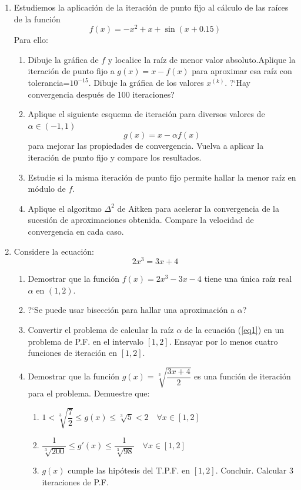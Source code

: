 \documentclass[12pt,letterpaper]{article}
\begin{document}
\begin{enumerate}
\item Estudiemos la aplicaci\'on de la iteraci\'on de punto fijo al c\'alculo de las ra\'ices de la funci\'on
$$
f(x) = -x^2 + x + \sin(x + 0.15)
$$
Para ello:
 \begin{enumerate}
  \item Dibuje la gr\'afica de $f$ y localice la ra\'iz de menor valor absoluto.Aplique la iteraci\'on de punto fijo a $g(x) = x - f(x)$ para aproximar esa ra\'iz con tolerancia=$10^{-15}$. Dibuje la
 gr\'afica de los valores $x^{(k)}$. ?`Hay convergencia despu\'es de 100 iteraciones?

 \item Aplique el siguiente esquema de iteraci\'on para diversos valores de $\alpha \in (-1,1)$ 
 $$
 g(x) = x - \alpha f(x)
 $$
 para mejorar las propiedades de convergencia. Vuelva a aplicar la iteraci\'on de punto fijo y compare los resultados.

 \item Estudie si la misma iteraci\'on de punto fijo permite hallar la menor ra\'iz en m\'odulo de $f$.

 \item Aplique el algoritmo $\Delta^2$ de Aitken para acelerar la convergencia de la sucesi\'on de aproximaciones obtenida.
Compare la velocidad de convergencia en cada caso.
 \end{enumerate}
\item Considere la ecuaci\'on:
\begin{equation}\label{eq1}
 2x^3 = 3x+4
\end{equation}

\begin{enumerate}
 \item Demostrar que la funci\'on $f(x) = 2x^3 - 3x - 4$ tiene una \'unica ra\'iz real $\alpha$ en $(1,2)$.
 \item ?`Se puede usar bisecci\'on para hallar una aproximaci\'on a $\alpha$?
 \item Convertir el problema de calcular la ra\'iz $\alpha$ de la ecuaci\'on (\ref{eq1}) en un problema de P.F. en el intervalo $[1,2]$. Ensayar por lo menos cuatro funciones de iteraci\'on en $[1,2]$.
 \item Demostrar que la funci\'on  $g(x) = \sqrt[3]{\dfrac{3x+4}{2}}$  es una funci\'on de iteraci\'on para el problema. Demuestre que:
 \begin{enumerate}
  \item $1 < \sqrt[3]{\dfrac{7}{2}}\leq g(x) \leq \sqrt[3]{5} < 2 \quad \forall x \in [1,2]$
  \item $\dfrac{1}{\sqrt[3]{200}} \leq g'(x) \leq \dfrac{1}{\sqrt[3]{98}} \quad \forall x \in [1,2]$
  \item $g(x)$ cumple las hip\'otesis del T.P.F. en $[1,2]$. Concluir. Calcular 3 iteraciones de P.F.
 \end{enumerate}
\end{enumerate}
\end{enumerate}
\end{document}
